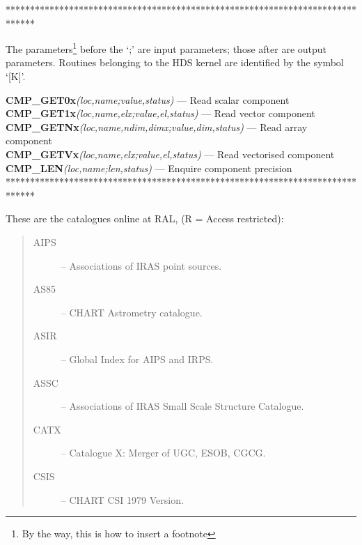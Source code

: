 \documentclass[twoside,11pt]{article}
\begin{document}
******************************************************************************

The parameters\footnote{By the way, this is how to insert a footnote} before
the `;' are input parameters; those after are output parameters.
Routines belonging to the HDS kernel are identified by the symbol `[K]'.

\noindent
\textbf{CMP\_GET0x}\emph{(loc,name;value,status)} --- Read scalar component\\
\textbf{CMP\_GET1x}\emph{(loc,name,elx;value,el,status)} --- Read vector component\\
\textbf{CMP\_GETNx}\emph{(loc,name,ndim,dimx;value,dim,status)} --- Read array
component\\
\textbf{CMP\_GETVx}\emph{(loc,name,elx;value,el,status)} --- Read vectorised
component\\
\textbf{CMP\_LEN}\emph{(loc,name;len,status)} --- Enquire component precision\\

******************************************************************************

These are the catalogues online at RAL, (R = Access restricted):
\begin{quote}
  \begin{description}
    \item [AIPS] -- Associations of IRAS point sources.
    \item [AS85] -- CHART Astrometry catalogue.
    \item [ASIR] -- Global Index for AIPS and IRPS.
    \item [ASSC] -- Associations of IRAS Small Scale Structure Catalogue.
    \item [CATX] -- Catalogue X: Merger of UGC, ESOB, CGCG.
    \item [CSIS] -- CHART CSI 1979 Version.
  \end{description}
\end{quote}

\newpage
\end{document}
